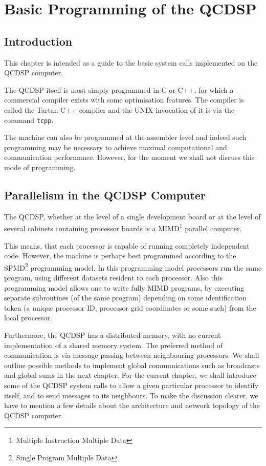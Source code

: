 \chapter{Basic Programming of the QCDSP}
\section{Introduction}
This chapter is intended as a guide to the basic
system calls implemented on the QCDSP computer.

The QCDSP itself is most simply programmed in C or 
C++, for which a commercial compiler exists with
some optimisation features. The compiler is called
the Tartan C++ compiler and the UNIX invocation of it 
is via the command {\tt tcpp}. 

The machine can also be programmed at the assembler
level and  indeed such programming may be necessary to achieve
maximal computational and communication performance. However,
for the moment we shall not discuss this mode of programming. 

\section{Parallelism in the QCDSP Computer}
The QCDSP, whether at the level of a single development board
or at the level of several cabinets containing processor boards
is a MIMD\footnote{Multiple Instruction Multiple Data} parallel computer. 

This means, that each processor is capable of running completely
independent code. However, the machine is 
perhaps best programmed according to the SPMD\footnote{Single Program Multiple Data} programming model. In this programming model processors run the 
same program, using different datasets resident to each processor. Also
this programming model allows one to write fully MIMD programs, by executing
separate subroutines (of the same program) depending on some identification
token (a unique processor ID, processor grid coordinates or some such) 
from the local processor. 

Furthermore, the QCDSP has a distributed memory, with no current
implementation of a shared memory system. The preferred method of 
communication is via message passing between neighbouring processors.
We shall outline possible methods to implement global communications
such as broadcasts and global sums in the next chapter.
For the current chapter, we shall introduce some of the QCDSP system
calls to allow a given particular processor to identify itself, and 
to send messages to its neighbours. To make the discussion clearer,
we have to mention a few details about the architecture and network
topology of the QCDSP computer.

